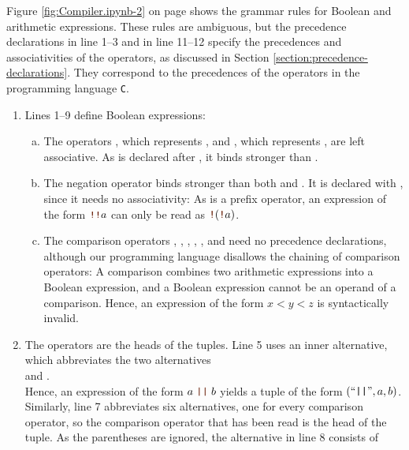 \noindent
Figure \ref{fig:Compiler.ipynb-2} on page \pageref{fig:Compiler.ipynb-2} shows the grammar rules for Boolean and
arithmetic expressions.  These rules are ambiguous, but the precedence declarations in line 1--3 and in line 11--12
specify the precedences and associativities of the operators, as discussed in Section
\ref{section:precedence-declarations}.  They correspond to the precedences of the operators in the programming
language \texttt{C}.
\begin{enumerate}
\item Lines 1--9 define Boolean expressions:
      \begin{enumerate}[(a)]
      \item The operators \quoted{||}, which represents , and \quoted{\&\&}, which represents
            , are left associative.  As \quoted{\&\&} is declared after \quoted{||}, it binds
            stronger than \quoted{||}.
      \item The negation operator \quoted{!} binds stronger than both \quoted{||} and \quoted{\&\&}.  It is
            declared with , since it needs no associativity:  As \quoted{!} is a prefix
            operator, an expression of the form $\mytt{!!}a$ can only be read as $\mytt{!}(\mytt{!}a)$.
      \item The comparison operators \quoted{==}, \quoted{!=}, \quoted{<=}, \quoted{>=}, \quoted{<}, and
            \quoted{>} need no precedence declarations, although our programming language disallows the
            chaining of comparison operators:  A comparison combines two arithmetic expressions into a Boolean
            expression, and a Boolean expression cannot be an operand of a comparison.  Hence, an expression of
            the form $x < y < z$ is syntactically invalid.
      \end{enumerate}
\item The operators are the heads of the tuples.  Line 5 uses an inner alternative, which abbreviates the two
      alternatives
      \\[0.2cm]
      \hspace*{1.3cm}
       \quad and \quad {}.
      \\[0.2cm]
      Hence, an expression of the form $a \;\mytt{||}\; b$ yields a tuple of the form $(\mbox{``\texttt{||}''}, a, b)$.  Similarly,
      line 7 abbreviates six alternatives, one for every comparison operator, so the comparison operator that has
      been read is the head of the tuple.  As the parentheses are ignored, the alternative in line 8 consists of

\end{enumerate}
